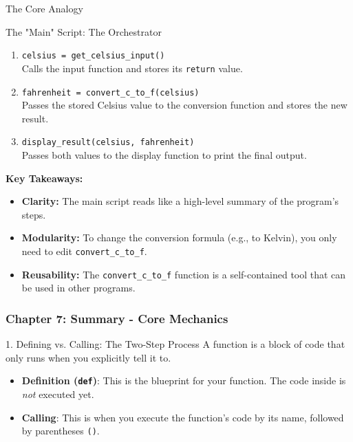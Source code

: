 \documentclass{beamer}
\begin{document}
\begin{frame}[fragile]
\begin{block}{The Core Analogy}
\begin{frame}[fragile]
\begin{block}{The "Main" Script: The Orchestrator}
    \begin{enumerate}
        \item \texttt{celsius = get\_celsius\_input()} \\
        Calls the input function and stores its \texttt{return} value.
        
        \item \texttt{fahrenheit = convert\_c\_to\_f(celsius)} \\
        Passes the stored Celsius value to the conversion function and stores the new result.
        
        \item \texttt{display\_result(celsius, fahrenheit)} \\
        Passes both values to the display function to print the final output.
    \end{enumerate}
    \end{block}
    
    \bigskip
    \textbf{Key Takeaways:}
    \begin{itemize}
        \item \textbf{Clarity:} The main script reads like a high-level summary of the program's steps.
        \item \textbf{Modularity:} To change the conversion formula (e.g., to Kelvin), you only need to edit \texttt{convert\_c\_to\_f}.
        \item \textbf{Reusability:} The \texttt{convert\_c\_to\_f} function is a self-contained tool that can be used in other programs.
    \end{itemize}
\end{frame}

\begin{frame}[fragile]
    \frametitle{Chapter 7: Summary - Core Mechanics}
    
    \begin{block}{1. Defining vs. Calling: The Two-Step Process}
        A function is a block of code that only runs when you explicitly tell it to.
        \begin{itemize}
            \item \textbf{Definition (\texttt{def})}: This is the blueprint for your function. The code inside is \textit{not} executed yet.
            \item \textbf{Calling}: This is when you execute the function's code by its name, followed by parentheses \texttt{()}.
        \end{itemize}
    \end{block}
    

\end{frame}
\end{block}
\end{frame}
\end{document}
